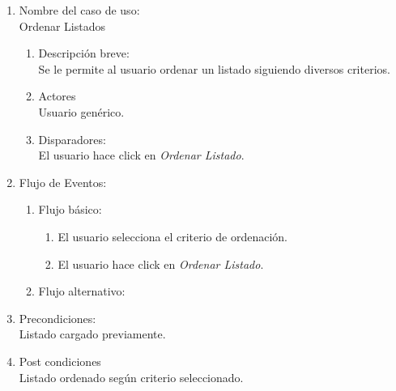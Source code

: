 \documentclass[a4paper,11pt]{article}
\begin{document}
\begin{enumerate}

    \item Nombre del caso de uso: \\
    Ordenar Listados

    \begin{enumerate}
    \item Descripción breve: \\
        Se le permite al usuario ordenar un listado siguiendo diversos criterios.
    \item Actores \\
        Usuario genérico.
    \item Disparadores: \\
        El usuario hace click en \emph{Ordenar Listado}.
    \end{enumerate}

    \item Flujo de Eventos: \\

    \begin{enumerate}

        \item Flujo básico:\\
        \begin{enumerate}
                    \item El usuario selecciona el criterio de ordenación.
                    \item El usuario hace click en \emph{Ordenar Listado}.
        \end{enumerate}
        \item Flujo alternativo:\\

    \end{enumerate}

    \item Precondiciones: \\
        Listado cargado previamente.

    \item Post condiciones \\
        Listado ordenado según criterio seleccionado.

\end{enumerate}

\end{document}
